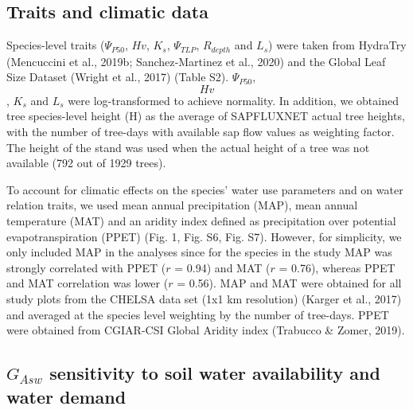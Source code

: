 \documentclass[11pt,twoside]{reedthesis}
\begin{document}
\subsection{Traits and climatic data}\label{traits-and-climatic-data}

Species-level traits (\textbar{}\(\Psi_{P50}\)\textbar{}, \(Hv\),
\(K_s\), \textbar{}\(\Psi_{TLP}\)\textbar{}, \(R_{depth}\) and \(L_s\))
were taken from HydraTry (Mencuccini et al., 2019b; Sanchez‐Martinez et
al., 2020) and the Global Leaf Size Dataset (Wright et al., 2017) (Table
S2). \textbar{}\(\Psi_{P50}\)\textbar{}, \[Hv\], \(K_s\) and \(L_s\)
were log-transformed to achieve normality. In addition, we obtained tree
species-level height (H) as the average of SAPFLUXNET actual tree
heights, with the number of tree-days with available sap flow values as
weighting factor. The height of the stand was used when the actual
height of a tree was not available (792 out of 1929 trees).\par

To account for climatic effects on the species' water use parameters and
on water relation traits, we used mean annual precipitation (MAP), mean
annual temperature (MAT) and an aridity index defined as precipitation
over potential evapotranspiration (PPET) (Fig. 1, Fig. S6, Fig. S7).
However, for simplicity, we only included MAP in the analyses since for
the species in the study MAP was strongly correlated with PPET (\(r\) =
0.94) and MAT (\(r\) = 0.76), whereas PPET and MAT correlation was lower
(\(r\) = 0.56). MAP and MAT were obtained for all study plots from the
CHELSA data set (1x1 km resolution) (Karger et al., 2017) and averaged
at the species level weighting by the number of tree-days. PPET were
obtained from CGIAR-CSI Global Aridity index (Trabucco \& Zomer,
2019).\par

\subsection{\texorpdfstring{\(G_{Asw}\) sensitivity to soil water
availability and water
demand}{G\_\{Asw\} sensitivity to soil water availability and water demand}}\label{g_asw-sensitivity-to-soil-water-availability-and-water-demand}
\end{document}
